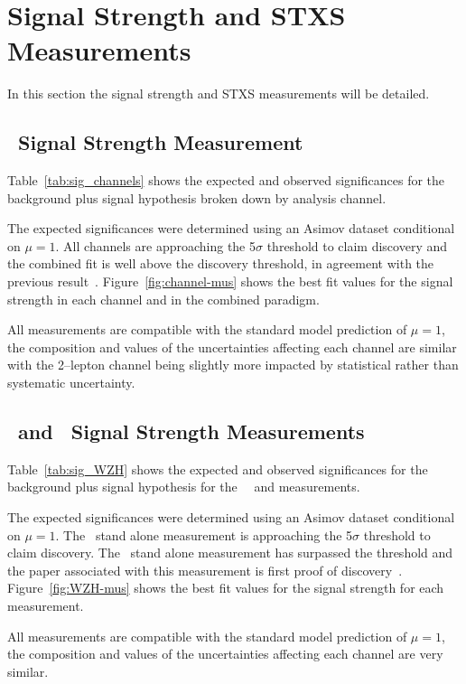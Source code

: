 \clearpage

\section{Signal Strength and STXS Measurements}
In this section the signal strength and STXS measurements will be detailed.

\subsection{\VH\ Signal Strength Measurement}
Table~\ref{tab:sig_channels} shows the expected and observed significances for
the background plus signal hypothesis broken down by analysis channel.

The expected significances were determined using an Asimov dataset conditional
on $\mu=1$. All channels are approaching the 5$\sigma$ threshold to claim
discovery and the combined fit is well above the discovery threshold, in
agreement with the previous result~\cite{vhbb-obs}. Figure~\ref{fig:channel-mus}
shows the best fit values for the signal strength in each channel and in the
combined paradigm.

All measurements are compatible with the standard model prediction of $\mu=1$,
the composition and values of the uncertainties affecting each channel are
similar with the 2--lepton channel being slightly more impacted by statistical
rather than systematic uncertainty.
% 
\clearpage
\subsection{\WH\ and \ZH\ Signal Strength Measurements}
Table~\ref{tab:sig_WZH} shows the expected and observed significances for
the background plus signal hypothesis for the \WH\, \ZH\ and \VH measurements.

The expected significances were determined using an Asimov dataset conditional
on $\mu=1$. The \WH\ stand alone measurement is approaching the 5$\sigma$
threshold to claim discovery. The \ZH\ stand alone measurement has surpassed the
threshold and the paper associated with this measurement is first proof of
discovery~\cite{final-paper}. Figure~\ref{fig:WZH-mus} shows the best fit values
for the signal strength for each measurement.

All measurements are compatible with the standard model prediction of $\mu=1$,
the composition and values of the uncertainties affecting each channel are very
similar.
\clearpage

